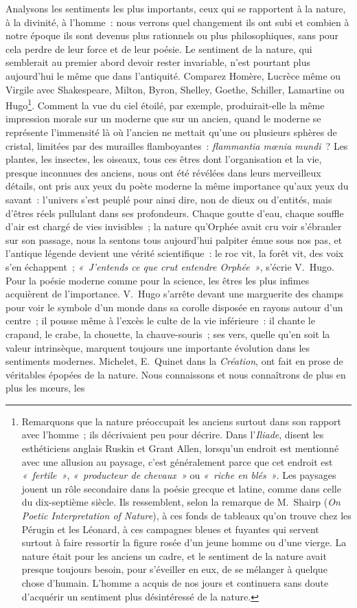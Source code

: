 \documentclass[french,twoside]{book} %
\begin{document}
Analysons les sentiments les plus importants, ceux qui se rapportent à la nature, à la divinité, à l’homme : nous verrons quel changement ils ont subi et combien à notre époque ils sont devenus plus rationnels ou plus philosophiques, sans pour cela perdre de leur force et de leur  poésie. Le sentiment de la nature, qui semblerait au premier abord devoir rester invariable, n’est pourtant plus aujourd’hui le même que dans l’antiquité. Comparez Homère, Lucrèce même ou Virgile avec Shakespeare, Milton, Byron, Shelley, Goethe, Schiller, Lamartine ou Hugo\footnote{Remarquons que la nature préoccupait les anciens surtout dans son rapport avec l’homme ; ils décrivaient peu pour décrire. Dans l’\emph{Iliade}, disent les esthéticiens anglais Ruskin et Grant Allen, lorsqu’un endroit est mentionné avec une allusion au paysage, c’est généralement parce que cet endroit est \emph{« fertile »}, \emph{« producteur de chevaux »} ou \emph{« riche en blés »}. Les paysages jouent un rôle secondaire dans la poésie grecque et latine, comme dans celle du dix-septième siècle. Ils ressemblent, selon la remarque de M. Shairp (\emph{On Poetic Interpretation of Nature}), à ces fonds de tableaux qu’on trouve chez les Pérugin et les Léonard, à ces campagnes bleues et fuyantes qui servent surtout à faire ressortir la figure rosée d’un jeune homme ou d’une vierge. La nature était pour les anciens un cadre, et le sentiment de la nature avait presque toujours besoin, pour s’éveiller en eux, de se mélanger à quelque chose d’humain. L’homme a acquis de nos jours et continuera sans doute d’acquérir un sentiment plus désintéressé de la nature.}. Comment la vue du ciel étoilé, par exemple, produirait-elle la même impression morale sur un moderne que sur un ancien, quand le moderne se représente l’immensité là où l’ancien ne mettait qu’une ou plusieurs sphères de cristal, limitées par des murailles flamboyantes : \emph{\emph{flammantia mœnia mundi}} ? Les plantes, les insectes, les oiseaux, tous ces êtres dont l’organisation et la vie, presque inconnues des anciens, nous ont été révélées dans leurs merveilleux détails, ont pris aux yeux du poète moderne la même importance qu’aux yeux du savant : l’univers s’est peuplé pour ainsi dire, non de dieux ou d’entités, mais d’êtres réels pullulant dans ses profondeurs. Chaque  goutte d’eau, chaque souffle d’air est chargé de vies invisibles ; la nature qu’Orphée avait cru voir s’ébranler sur son passage, nous la sentons tous aujourd’hui palpiter émue sous nos pas, et l’antique légende devient une vérité scientifique : le roc vit, la forêt vit, des voix s’en échappent ; \emph{« J’entends ce que crut entendre Orphée »}, s’écrie V. Hugo. Pour la poésie moderne comme pour la science, les êtres les plus infimes acquièrent de l’importance. V. Hugo s’arrête devant une marguerite des champs pour voir le symbole d’un monde dans sa corolle disposée en rayons autour d’un centre ; il pousse même à l’excès le culte de la vie inférieure : il chante le crapaud, le crabe, la chouette, la chauve-souris ; ses vers, quelle qu’en soit la valeur intrinsèque, marquent toujours une importante évolution dans les sentiments modernes. Michelet, E. Quinet dans la \emph{Création}, ont fait en prose de véritables épopées de la nature. Nous connaissons et nous connaîtrons de plus en plus les mœurs, les 
\end{document}
